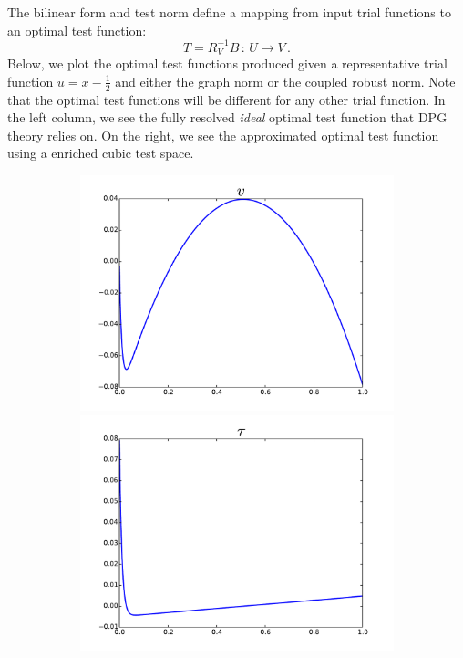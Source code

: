 \documentclass{article}
\begin{document}
The bilinear form and test norm define a mapping from input trial functions to an optimal test function:
\[
T=R_V^{-1}B\,:\,U\rightarrow V\,.
\]
Below, we plot the optimal test functions produced given a representative trial function $u=x-\frac{1}{2}$
and either the graph norm or the coupled robust norm.
Note that the optimal test functions will be different for any other trial function.
In the left column, we see the fully resolved \emph{ideal} optimal test function that DPG theory relies on.
On the right, we see the approximated optimal test function using a enriched cubic test space.
\begin{figure}[ht]
\centering
\begin{subfigure}[t]{0.4\textwidth}
\centering
\includegraphics[width=\textwidth]{OptimalTestFunctions/uLinear_1e-2/steady/graph_steady_v}\\
\includegraphics[width=\textwidth]{OptimalTestFunctions/uLinear_1e-2/steady/graph_steady_tau}\\

\end{subfigure}
\end{figure}
\end{document}

